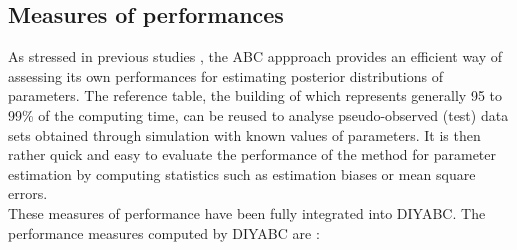 \subsection{Measures of performances}
As stressed in previous studies \citep[e.g.][]{Ex2005}, the ABC appproach provides an efficient way of assessing its own performances for estimating posterior distributions of parameters. The reference table, the building of which represents generally 95 to 99\% of the computing time, can be reused to analyse pseudo-observed (test) data sets obtained through simulation with known values of parameters. It is then rather quick and easy to evaluate the performance of the method for parameter estimation by computing statistics such as estimation biases or mean square errors.\\
These measures of performance have been fully integrated into DIYABC. The performance measures computed by DIYABC are :
